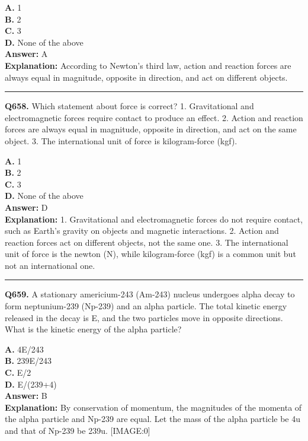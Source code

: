 \documentclass[12pt]{article}
\begin{document}
\textbf{A.} 1 \\
\textbf{B.} 2 \\
\textbf{C.} 3 \\
\textbf{D.} None of the above \\

\textbf{Answer:} A \\
\textbf{Explanation:} According to Newton's third law, action and reaction forces are always equal in magnitude, opposite in direction, and act on different objects.

\hrule
\vspace{1em}


\noindent
\textbf{Q658.} Which statement about force is correct?
1.
Gravitational and electromagnetic forces require contact to produce an effect.
2.
Action and reaction forces are always equal in magnitude, opposite in direction, and act on the same object.
3.
The international unit of force is kilogram-force (kgf).



\textbf{A.} 1 \\
\textbf{B.} 2 \\
\textbf{C.} 3 \\
\textbf{D.} None of the above \\

\textbf{Answer:} D \\
\textbf{Explanation:} 1.
Gravitational and electromagnetic forces do not require contact, such as Earth's gravity on objects and magnetic interactions.
2.
Action and reaction forces act on different objects, not the same one.
3.
The international unit of force is the newton (N), while kilogram-force (kgf) is a common unit but not an international one.

\hrule
\vspace{1em}


\noindent
\textbf{Q659.} A stationary americium-243 (Am-243) nucleus undergoes alpha decay to form neptunium-239 (Np-239) and an alpha particle. The total kinetic energy released in the decay is E, and the two particles move in opposite directions. What is the kinetic energy of the alpha particle?



\textbf{A.} 4E/243 \\
\textbf{B.} 239E/243 \\
\textbf{C.} E/2 \\
\textbf{D.} E/(239+4) \\

\textbf{Answer:} B \\
\textbf{Explanation:} By conservation of momentum, the magnitudes of the momenta of the alpha particle and Np-239 are equal. Let the mass of the alpha particle be 4u and that of Np-239 be 239u.
[IMAGE:0]
\end{document}

